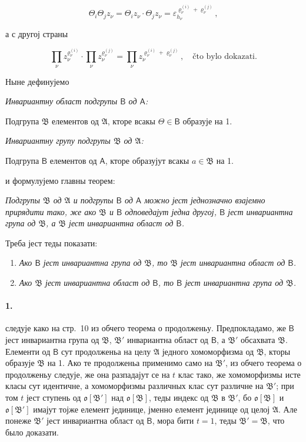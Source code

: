 \documentclass[11pt]{article}
\begin{document}
\[
\Theta_i\Theta_j z_\nu=\Theta_i z_\nu\cdot \Theta_j z_\nu
=\varepsilon_{h_\nu}^{\varrho_\nu^{(i)}+\varrho_\nu^{(j)}},
\]

а с другој страны

\[
\prod_\nu z_\nu^{\varrho_\nu^{(i)}}\cdot
\prod_\nu z_\nu^{\varrho_\nu^{(j)}}=
\prod_\nu z_\nu^{\varrho_\nu^{(i)}+\varrho_\nu^{(j)}},
\quad\text{čto bylo dokazati.}
\]

Ныне дефинујемо

\emph{Инвариантну област подгрупы \(\mathsf B\) од \(\mathsf A\):}

Подгрупа \(\mathfrak B\) елементов од \(\mathfrak A\), кторе всакы \(\Theta\in\mathsf B\) образује на 1.

\emph{Инвариантну групу подгрупы \(\mathfrak B\) од \(\mathfrak A\):}

Подгрупа \(\mathsf B\) елементов од \(\mathsf A\), кторе образујут всакы \(a\in\mathfrak B\) на 1.

и формулујемо главны теорем:

\emph{Подгрупы \(\mathfrak B\) од \(\mathfrak A\) и подгрупы \(\mathsf B\) од \(\mathsf A\) можно јест једнозначно взајемно прирядити тако, же ако \(\mathfrak B\) и \(\mathsf B\) одповедајут једна другој, \(\mathsf B\) јест инвариантна група од \(\mathfrak B\), а \(\mathfrak B\) јест инвариантна област од \(\mathsf B\).}

Треба јест теды показати:

\begin{enumerate}
\item \emph{Ако \(\mathsf B\) јест инвариантна група од \(\mathfrak B\), то \(\mathfrak B\) јест инвариантна област од \(\mathsf B\).}
\item \emph{Ако \(\mathfrak B\) јест инвариантна област од \(\mathsf B\), то \(\mathsf B\) јест инвариантна група од \(\mathfrak B\).}
\end{enumerate}

\paragraph{1.}
следује како на стр.~10 из обчего теорема о продолженьу. Предпокладамо, же \(\mathsf B\) јест инвариантна група од \(\mathfrak B\), \(\mathfrak B'\) инвариантна област од \(\mathsf B\), а \(\mathfrak B'\) обсахвата \(\mathfrak B\). Елементи од \(\mathsf B\) сут продолженьа на целу \(\mathfrak A\) једного хомоморфизма од \(\mathfrak B\), кторы образује \(\mathfrak B\) на 1. Ако те продолженьа применимо само на \(\mathfrak B'\), из обчего теорема о продолженьу следује, же она разпадајут се на \(t\) клас тако, же хомоморфизмы исте класы сут идентичне, а хомоморфизмы различных клас сут различне на \(\mathfrak B'\); при том \(t\) јест ступень од \(\mathfrak o[\mathfrak B']\) над \(\mathfrak o[\mathfrak B]\), теды индекс од \(\mathfrak B\) в \(\mathfrak B'\), бо \(\mathfrak o[\mathfrak B]\) и \(\mathfrak o[\mathfrak B']\) имајут тојже елемент јединице, јменно елемент јединице од целој \(\mathfrak A\). Але понеже \(\mathfrak B'\) јест инвариантна област од \(\mathsf B\), мора бити \(t=1\), теды \(\mathfrak B'=\mathfrak B\), что было доказати.
\end{document}
